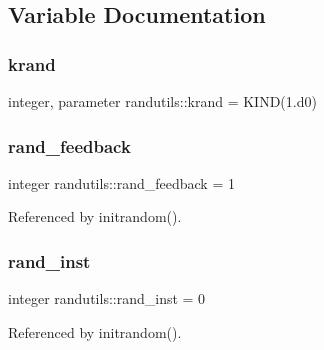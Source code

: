 \subsection{Variable Documentation}
\mbox{\label{namespacerandutils_a4a902df9abe9715fa91cccf15f4cfb2f}} 
\subsubsection{\texorpdfstring{krand}{krand}}
{\footnotesize\ttfamily integer, parameter randutils\+::krand = K\+I\+ND(1.d0)}

\mbox{\label{namespacerandutils_acbcf68b5e32d0ef96da88ca3de39a454}} 
\subsubsection{\texorpdfstring{rand\+\_\+feedback}{rand\_feedback}}
{\footnotesize\ttfamily integer randutils\+::rand\+\_\+feedback = 1}



Referenced by initrandom().

\mbox{\label{namespacerandutils_aaf067b67d4f4be83b834ee102bdd6a22}} 
\subsubsection{\texorpdfstring{rand\+\_\+inst}{rand\_inst}}
{\footnotesize\ttfamily integer randutils\+::rand\+\_\+inst = 0}



Referenced by initrandom().

